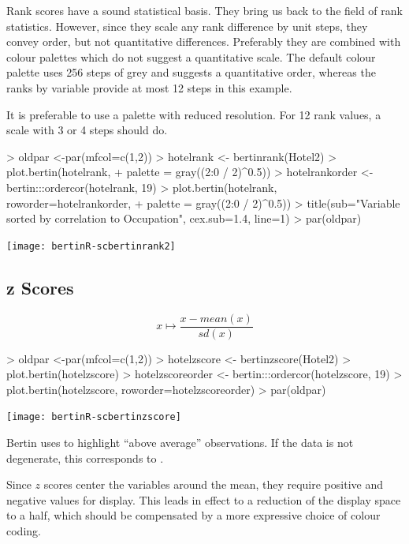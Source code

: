 \documentclass[nogin, dvips,12pt,a4paper,twoside]{amsart}
\begin{document}
Rank scores have a sound statistical basis. They bring us back to the field of rank statistics. However, since they scale any rank difference by unit steps, they convey order, but not quantitative differences. Preferably they are combined with colour palettes which do not suggest a quantitative scale. The default colour palette uses 256 steps of grey and suggests a quantitative order, whereas the ranks by variable provide at most 12 steps in this example. 

It is preferable to use a palette with reduced resolution. For 12 rank values, a scale with 3 or 4 steps should do. 

\begin{Schunk}
\begin{Sinput}
> oldpar <-par(mfcol=c(1,2))
> hotelrank <- bertinrank(Hotel2)
> plot.bertin(hotelrank,
+ 	palette = gray((2:0 / 2)^0.5))
> hotelrankorder <- bertin:::ordercor(hotelrank, 19)
> plot.bertin(hotelrank, roworder=hotelrankorder,
+ 	palette = gray((2:0 / 2)^0.5))
> title(sub="Variable sorted by correlation to Occupation", cex.sub=1.4, line=1)
> par(oldpar)
\end{Sinput}
\end{Schunk}
\texttt{[image: bertinR-scbertinrank2]}

\pagebreak
\subsection{z Scores}
$$
x \mapsto \frac{ x - mean(x)}{sd(x)}
$$
\begin{Schunk}
\begin{Sinput}
> oldpar <-par(mfcol=c(1,2))
> hotelzscore <- bertinzscore(Hotel2)
> plot.bertin(hotelzscore)
> hotelzscoreorder <- bertin:::ordercor(hotelzscore, 19)
> plot.bertin(hotelzscore, roworder=hotelzscoreorder)
> par(oldpar)
\end{Sinput}
\end{Schunk}
\texttt{[image: bertinR-scbertinzscore]}

Bertin uses to highlight ``above average''  observations. If the data is not degenerate, this corresponds to .

Since $z$ scores center the variables around the mean, they require positive and negative values for display. This leads in effect to a reduction of the display space to a half, which should be compensated by a more expressive choice of colour coding.

\pagebreak
\end{document}
